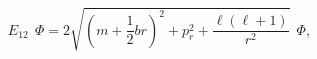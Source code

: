\begin{equation}                                
E_{12}~~\Phi= 2\sqrt{(m+\frac{1}{2}br)^{2}+p^{2}_{r}+                              
\frac{\ell(\ell+1)}{r^{2}}} ~~\Phi,           \label{eq:e}                                
\end{equation} 
